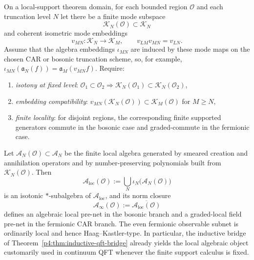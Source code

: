 \documentclass[12pt,a4paper]{article}
\begin{document}
\begin{theorem}
\label{p4:thm:compatible-local-net}
On a local-support theorem domain, for each bounded region \(\mathcal O\) and each truncation level \(N\) let there be a finite mode subspace
\[
\mathcal K_N(\mathcal O)\subset \mathcal K_N
\]
and coherent isometric mode embeddings
\[
v_{MN}:\mathcal K_N\longrightarrow\mathcal K_M,
\qquad
v_{LM}v_{MN}=v_{LN}.
\]
Assume that the algebra embeddings \(\iota_{MN}\) are induced by these mode
maps on the chosen CAR or bosonic truncation scheme, so, for example,
\(\iota_{MN}(\mathfrak a_N(f))=\mathfrak a_M(v_{MN}f)\).  Require:
\begin{enumerate}[label=(\roman*), leftmargin=2em]
\item \emph{isotony at fixed level}: \(\mathcal O_1\subset \mathcal O_2\Rightarrow \mathcal K_N(\mathcal O_1)\subset \mathcal K_N(\mathcal O_2)\),
\item \emph{embedding compatibility}:
      \(v_{MN}(\mathcal K_N(\mathcal O))
      \subset \mathcal K_M(\mathcal O)\) for \(M\ge N\),
\item \emph{finite locality}: for disjoint regions, the corresponding finite supported generators commute in the bosonic case and graded-commute in the fermionic case.
\end{enumerate}
Let \(\mathcal A_N(\mathcal O)\subset \mathcal A_N\) be the finite local algebra
generated by smeared creation and annihilation operators and by
number-preserving polynomials built from \(\mathcal K_N(\mathcal O)\).
Then
\[
\mathcal A_{\mathrm{loc}}(\mathcal O):=
\bigcup_N \iota_N\bigl(\mathcal A_N(\mathcal O)\bigr)
\]
is an isotonic \(*\)-subalgebra of \(\mathcal A_{\mathrm{loc}}\), and its
norm closure
\[
\mathcal A_\infty(\mathcal O):=
\overline{\mathcal A_{\mathrm{loc}}(\mathcal O)}
\]
defines an algebraic local pre-net in the bosonic branch and a graded-local
field pre-net in the fermionic CAR branch.  The even fermionic observable
subnet is ordinarily local and hence Haag--Kastler-type.
In particular, the inductive bridge of
Theorem~\ref{p4:thm:inductive-qft-bridge} already yields the local algebraic
object customarily used in continuum QFT whenever the finite support calculus is
fixed.
\end{theorem}
\end{document}
